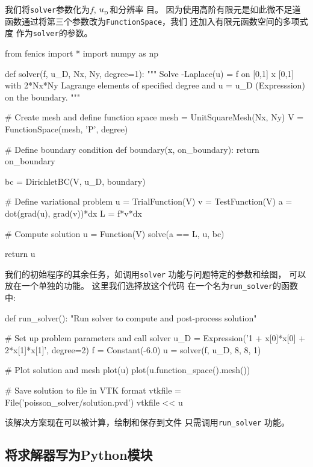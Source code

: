 我们将\texttt{solver}参数化为$f$, $u_{_\mathrm{D}}$和分辨率
目。 因为使用高阶有限元是如此微不足道
函数通过将第三个参数改为\texttt{FunctionSpace}，我们
还加入有限元函数空间的多项式度
作为\texttt{solver}的参数。

\begin{python}
from fenics import *
import numpy as np

def solver(f, u_D, Nx, Ny, degree=1):
    """
    Solve -Laplace(u) = f on [0,1] x [0,1] with 2*Nx*Ny Lagrange
    elements of specified degree and u = u_D (Expresssion) on
    the boundary.
    """

    # Create mesh and define function space
    mesh = UnitSquareMesh(Nx, Ny)
    V = FunctionSpace(mesh, 'P', degree)

    # Define boundary condition
    def boundary(x, on_boundary):
        return on_boundary

    bc = DirichletBC(V, u_D, boundary)

    # Define variational problem
    u = TrialFunction(V)
    v = TestFunction(V)
    a = dot(grad(u), grad(v))*dx
    L = f*v*dx

    # Compute solution
    u = Function(V)
    solve(a == L, u, bc)

    return u
\end{python}

我们的初始程序的其余任务，如调用\texttt{solver}
功能与问题特定的参数和绘图，
可以放在一个单独的功能。 这里我们选择放这个代码
在一个名为\verb!run_solver!的函数中:

\begin{python}
def run_solver():
    "Run solver to compute and post-process solution"

    # Set up problem parameters and call solver
    u_D = Expression('1 + x[0]*x[0] + 2*x[1]*x[1]', degree=2)
    f = Constant(-6.0)
    u = solver(f, u_D, 8, 8, 1)

    # Plot solution and mesh
    plot(u)
    plot(u.function_space().mesh())

    # Save solution to file in VTK format
    vtkfile = File('poisson_solver/solution.pvd')
    vtkfile << u
\end{python}

该解决方案现在可以被计算，绘制和保存到文件
只需调用\verb!run_solver! 功能。

\subsection{将求解器写为Python模块}


